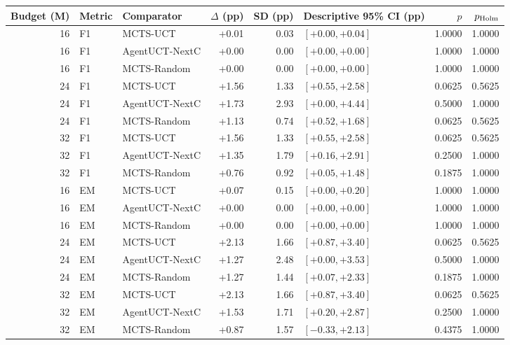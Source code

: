 \begin{tabular}{rllrrlrr}
\toprule
Budget (M) & Metric & Comparator & $\Delta$ (pp) & SD (pp) & Descriptive 95\% CI (pp) & $p$ & $p_{\rm Holm}$ \\
\midrule
16 & F1 & MCTS-UCT & +0.01 & 0.03 & $[+0.00, +0.04]$ & 1.0000 & 1.0000 \\
16 & F1 & AgentUCT-NextC & +0.00 & 0.00 & $[+0.00, +0.00]$ & 1.0000 & 1.0000 \\
16 & F1 & MCTS-Random & +0.00 & 0.00 & $[+0.00, +0.00]$ & 1.0000 & 1.0000 \\
24 & F1 & MCTS-UCT & +1.56 & 1.33 & $[+0.55, +2.58]$ & 0.0625 & 0.5625 \\
24 & F1 & AgentUCT-NextC & +1.73 & 2.93 & $[+0.00, +4.44]$ & 0.5000 & 1.0000 \\
24 & F1 & MCTS-Random & +1.13 & 0.74 & $[+0.52, +1.68]$ & 0.0625 & 0.5625 \\
32 & F1 & MCTS-UCT & +1.56 & 1.33 & $[+0.55, +2.58]$ & 0.0625 & 0.5625 \\
32 & F1 & AgentUCT-NextC & +1.35 & 1.79 & $[+0.16, +2.91]$ & 0.2500 & 1.0000 \\
32 & F1 & MCTS-Random & +0.76 & 0.92 & $[+0.05, +1.48]$ & 0.1875 & 1.0000 \\
\midrule
16 & EM & MCTS-UCT & +0.07 & 0.15 & $[+0.00, +0.20]$ & 1.0000 & 1.0000 \\
16 & EM & AgentUCT-NextC & +0.00 & 0.00 & $[+0.00, +0.00]$ & 1.0000 & 1.0000 \\
16 & EM & MCTS-Random & +0.00 & 0.00 & $[+0.00, +0.00]$ & 1.0000 & 1.0000 \\
24 & EM & MCTS-UCT & +2.13 & 1.66 & $[+0.87, +3.40]$ & 0.0625 & 0.5625 \\
24 & EM & AgentUCT-NextC & +1.27 & 2.48 & $[+0.00, +3.53]$ & 0.5000 & 1.0000 \\
24 & EM & MCTS-Random & +1.27 & 1.44 & $[+0.07, +2.33]$ & 0.1875 & 1.0000 \\
32 & EM & MCTS-UCT & +2.13 & 1.66 & $[+0.87, +3.40]$ & 0.0625 & 0.5625 \\
32 & EM & AgentUCT-NextC & +1.53 & 1.71 & $[+0.20, +2.87]$ & 0.2500 & 1.0000 \\
32 & EM & MCTS-Random & +0.87 & 1.57 & $[-0.33, +2.13]$ & 0.4375 & 1.0000 \\
\bottomrule
\end{tabular}
